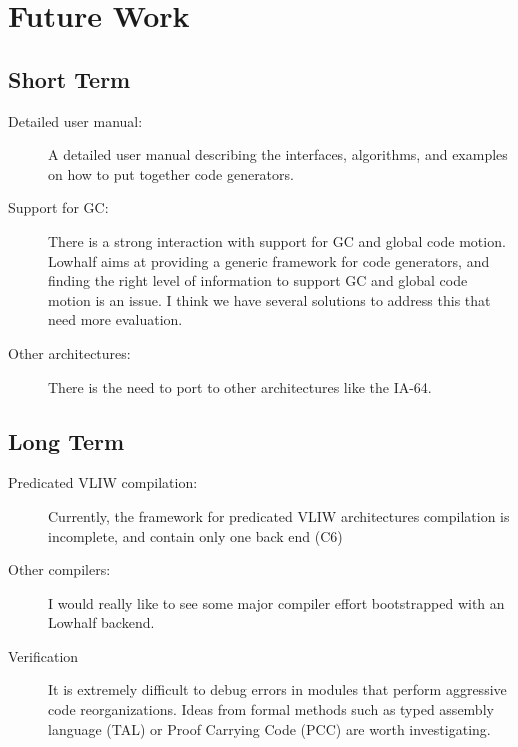 \section{Future Work}
\subsection{Short Term}

\begin{description}    
\item[Detailed user manual:]
    A detailed user manual describing the interfaces, algorithms, 
    and examples on how to put together code generators.
\item[Support for GC:]
      There is a strong interaction
     with support for GC and global code motion. Lowhalf aims at
     providing a generic framework for code generators, and finding
     the right level of information to support GC and global code
     motion is an issue. I think we have several solutions to address
     this that need more evaluation.
\item[Other architectures:] There is the need to port
     to other architectures like the IA-64. 
\end{description}
\hr
\subsection{Long Term}
\begin{description}
 \item[Predicated VLIW compilation:] Currently, the framework
for predicated VLIW architectures compilation
is incomplete, and contain only one back end (C6)
\item[Other compilers:] I would really like to see some
major compiler effort bootstrapped with an Lowhalf backend.
\item[Verification] It is extremely difficult to
debug errors in modules that perform aggressive code
reorganizations. Ideas from formal methods such as typed assembly
language (TAL) or Proof Carrying Code (PCC) are worth investigating.
\end{description}
